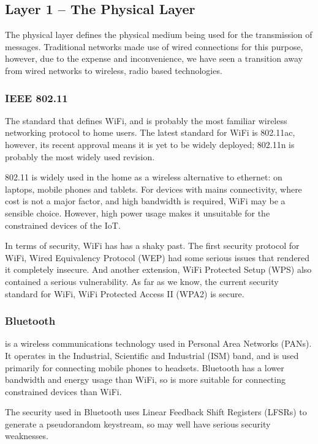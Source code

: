 \documentclass[journal]{IEEEtran}
\begin{document}
\subsection{Layer 1 -- The Physical Layer}
The physical layer defines the physical medium being used for the transmission
of messages. Traditional networks made use of wired connections for this
purpose, however, due to the expense and inconvenience, we have seen a
transition away from wired networks to wireless, radio based technologies. 

\subsubsection{IEEE 802.11}
The standard that defines WiFi, and is probably the most
familiar wireless networking protocol to home users. The latest standard for
WiFi is 802.11ac, however, its recent approval means it is yet to be widely
deployed; 802.11n is probably the most widely used revision. 

802.11 is widely used in the home as a wireless alternative to ethernet: on
laptops, mobile phones and tablets. For devices with mains connectivity, where
cost is not a major factor, and high bandwidth is required, WiFi may be a
sensible choice.  However, high power usage makes it unsuitable for the
constrained devices of the IoT. 

In terms of security, WiFi has has a shaky past. The first security protocol
for WiFi, Wired Equivalency Protocol (WEP) had some serious issues that
rendered it completely insecure. And another extension, WiFi Protected
Setup (WPS) also contained a serious vulnerability. As far as we know, the
current security standard for WiFi, WiFi Protected Access II (WPA2) is
secure. 

\subsubsection{Bluetooth}
is a wireless communications technology used in Personal Area
Networks (PANs). It operates in the Industrial, Scientific and Industrial (ISM)
band, and is used primarily for connecting mobile phones to headsets. Bluetooth
has a lower bandwidth and energy usage than WiFi, so is more suitable for
connecting constrained devices than WiFi. 

The security used in Bluetooth uses Linear Feedback Shift Registers (LFSRs) to
generate a pseudorandom keystream, so may well have serious security
weaknesses.
\end{document}
